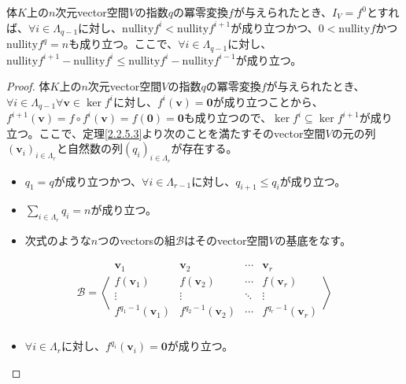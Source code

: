 \documentclass[dvipdfmx]{jsarticle}
\begin{document}
\begin{thm}\label{2.2.5.4}
体$K$上の$n$次元vector空間$V$の指数$q$の冪零変換$f$が与えられたとき、$I_{V} = f^{0}$とすれば、$\forall i \in \varLambda_{q - 1}$に対し、${\mathrm{nullity}}f^{i} < {\mathrm{nullity}}f^{i + 1}$が成り立つかつ、$0 < {\mathrm{nullity}}f$かつ${\mathrm{nullity}}f^{q} = n$も成り立つ。ここで、$\forall i \in \varLambda_{q - 1}$に対し、${\mathrm{nullity}}f^{i + 1} - {\mathrm{nullity}}f^{i} \leq {\mathrm{nullity}}f^{i} - {\mathrm{nullity}}f^{i - 1}$が成り立つ。
\end{thm}
\begin{proof}
体$K$上の$n$次元vector空間$V$の指数$q$の冪零変換$f$が与えられたとき、$\forall i \in \varLambda_{q - 1}\forall\mathbf{v} \in \ker f^{i}$に対し、$f^{i}\left( \mathbf{v} \right) = \mathbf{0}$が成り立つことから、$f^{i + 1}\left( \mathbf{v} \right) = f \circ f^{i}\left( \mathbf{v} \right) = f\left( \mathbf{0} \right) = \mathbf{0}$も成り立つので、$\ker f^{i} \subseteq \ker f^{i + 1}$が成り立つ。ここで、定理\ref{2.2.5.3}より次のことを満たすそのvector空間$V$の元の列$\left( \mathbf{v}_{i} \right)_{i \in \varLambda_{r}}$と自然数の列$\left( q_{i} \right)_{i \in \varLambda_{r}}$が存在する。
\begin{itemize}
\item
  $q_{1} = q$が成り立つかつ、$\forall i \in \varLambda_{r - 1}$に対し、$q_{i + 1} \leq q_{i}$が成り立つ。
\item
  $\sum_{i \in \varLambda_{r}} q_{i} = n$が成り立つ。
\item
  次式のような$n$つのvectorsの組$\mathcal{B}$はそのvector空間$V$の基底をなす。
\end{itemize}
\begin{align*}
\mathcal{B} =\left\langle \begin{matrix}
\mathbf{v}_{1} & \mathbf{v}_{2} & \cdots & \mathbf{v}_{r} \\
f\left( \mathbf{v}_{1} \right) & f\left( \mathbf{v}_{2} \right) & \cdots & f\left( \mathbf{v}_{r} \right) \\
 \vdots & \vdots & \ddots & \vdots \\
f^{q_{1} - 1}\left( \mathbf{v}_{1} \right) & f^{q_{2} - 1}\left( \mathbf{v}_{2} \right) & \cdots & f^{q_{r} - 1}\left( \mathbf{v}_{r} \right) \\
\end{matrix} \right\rangle
\end{align*}
\begin{itemize}
\item
  $\forall i \in \varLambda_{r}$に対し、$f^{q_{i}}\left( \mathbf{v}_{i} \right) = \mathbf{0}$が成り立つ。

\end{itemize}
\end{proof}
\end{document}

